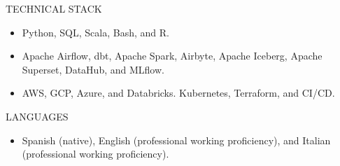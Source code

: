 \documentclass{mcdowellcv}
\begin{document}
\begin{cvsection}{TECHNICAL STACK}
	\begin{cvsubsection}{}{}{}
		\begin{itemize}
			\item Python, SQL, Scala, Bash, and R.
			\item Apache Airflow, dbt, Apache Spark, Airbyte, Apache Iceberg, Apache Superset, DataHub, and MLflow.
			\item AWS, GCP, Azure, and Databricks. Kubernetes, Terraform, and CI/CD.
		\end{itemize}
	\end{cvsubsection}
\end{cvsection}

\begin{cvsection}{LANGUAGES}
	\begin{cvsubsection}{}{}{}
		\begin{itemize}
			\item Spanish (native), English (professional working proficiency), and Italian (professional working proficiency).
		\end{itemize}
	\end{cvsubsection}
\end{cvsection}
\end{document}
